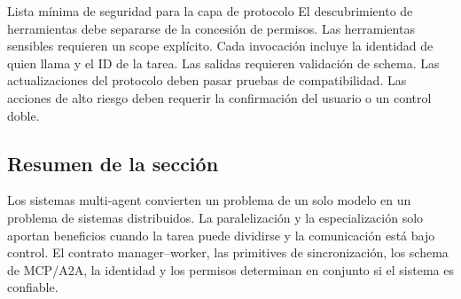
\begin{importantbox}{Lista mínima de seguridad para la capa de protocolo}
El descubrimiento de herramientas debe separarse de la concesión de permisos. Las herramientas sensibles requieren un scope explícito. Cada invocación incluye la identidad de quien llama y el ID de la tarea. Las salidas requieren validación de schema. Las actualizaciones del protocolo deben pasar pruebas de compatibilidad. Las acciones de alto riesgo deben requerir la confirmación del usuario o un control doble.
\end{importantbox}

\subsection{Resumen de la sección}

Los sistemas multi-agent convierten un problema de un solo modelo en un problema de sistemas distribuidos. La paralelización y la especialización solo aportan beneficios cuando la tarea puede dividirse y la comunicación está bajo control. El contrato manager--worker, las primitives de sincronización, los schema de MCP/A2A, la identidad y los permisos determinan en conjunto si el sistema es confiable.
